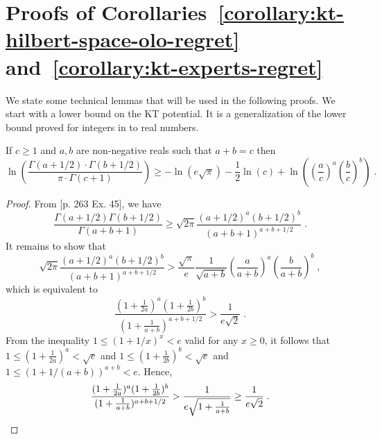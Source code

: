 \section{Proofs of Corollaries~\ref{corollary:kt-hilbert-space-olo-regret} and~\ref{corollary:kt-experts-regret}}
\label{section:corollaries_reductions}

We state some technical lemmas that will be used in the following proofs. We
start with a lower bound on the \ac{KT} potential. It is a generalization of
the lower bound proved for integers in \citet{Willems-Shtarkov-Tjalkens-1995}
to real numbers.

\begin{lemma}
\label{lemma:approx_gamma_real}
If $c \ge 1$ and $a,b$ are non-negative reals such that $a + b = c$ then
\[
\ln \left(\frac{\Gamma(a + 1/2) \cdot \Gamma(b + 1/2)}{\pi \cdot \Gamma(c+1)} \right)
\ge - \ln(e \sqrt{\pi}) -\frac{1}{2} \ln(c) +\ln \left(\left( \frac{a}{c} \right)^a \left( \frac{b}{c} \right)^b\right) \; .
\]
\end{lemma}
%
\begin{proof}
From \cite{Whittaker-Watson-1962}[p. 263 Ex. 45], we have
\[
\frac{\Gamma(a+1/2)\Gamma(b+1/2)}{\Gamma(a+b+1)} \ge \sqrt{2\pi} \frac{(a+1/2)^a (b+1/2)^b}{(a+b+1)^{a+b+1/2}} \; .
\]
It remains to show that
\[
\sqrt{2\pi} \frac{(a+1/2)^a (b+1/2)^b}{(a+b+1)^{a+b+1/2}} > \frac{\sqrt{\pi}}{e} \frac{1}{\sqrt{a+b}} \left( \frac{a}{a+b} \right)^a \left( \frac{b}{a+b} \right)^b \; ,
\]
which is equivalent to
\[
\frac{(1+\frac{1}{2a})^a (1+\frac{1}{2b})^b}{(1+\frac{1}{a+b})^{a+b+1/2}} > \frac{1}{e\sqrt{2}} \; .
\]
From the inequality $1 \le (1+1/x)^x < e$ valid for any $x \ge 0$, it follows
that $1 \le (1+\frac{1}{2a})^a < \sqrt{e}$ and $1 \le (1+\frac{1}{2b})^b < \sqrt{e}$
and $1 \le (1+1/(a+b))^{a+b} < e$. Hence,
\[
\frac{(1+\frac{1}{2a})^a (1+\frac{1}{2b})^b}{(1+\frac{1}{a+b})^{a+b+1/2}}
> \frac{1}{e \sqrt{1 + \frac{1}{a+b}}}
\ge \frac{1}{e \sqrt{2}} \; . \qedhere
\]
\end{proof}


